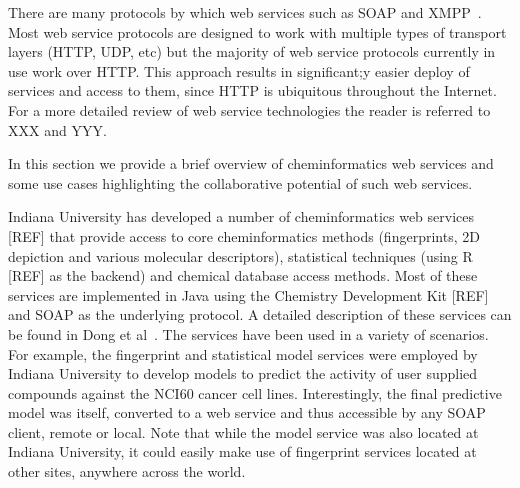 \documentclass[12pt]{book}
\begin{document}
There are many protocols by which web services such as SOAP and
XMPP~\cite{Wagener2009}. Most web service protocols are designed to
work with multiple types of transport layers (HTTP, UDP, etc) but the
majority of web service protocols currently in use work over
HTTP. This approach results in significant;y easier deploy of services
and access to them, since HTTP is ubiquitous throughout the
Internet. For a more detailed review of web service technologies the
reader is referred to XXX and YYY.

In this section we provide a brief overview of cheminformatics web
services and some use cases highlighting the collaborative potential
of such web services.

Indiana University has developed a number of cheminformatics web
services [REF] that provide access to core cheminformatics methods
(fingerprints, 2D depiction and various molecular descriptors),
statistical techniques (using R [REF] as the backend) and chemical
database access methods. Most of these services are implemented in
Java using the Chemistry Development Kit [REF] and SOAP as the
underlying protocol. A detailed description of these services can be
found in Dong et al~\cite{Dong2007Web}. The services have been used in
a variety of scenarios. For example, the fingerprint and statistical
model services were employed by Indiana University to develop
models to predict the activity of user supplied compounds against the
NCI60 cancer cell lines. Interestingly, the final predictive model was
itself, converted to a web service and thus accessible by any SOAP client,
remote or local. Note that while the model service was also located at
Indiana University, it could easily make use of fingerprint services
located at other sites, anywhere across the world.
\end{document}
